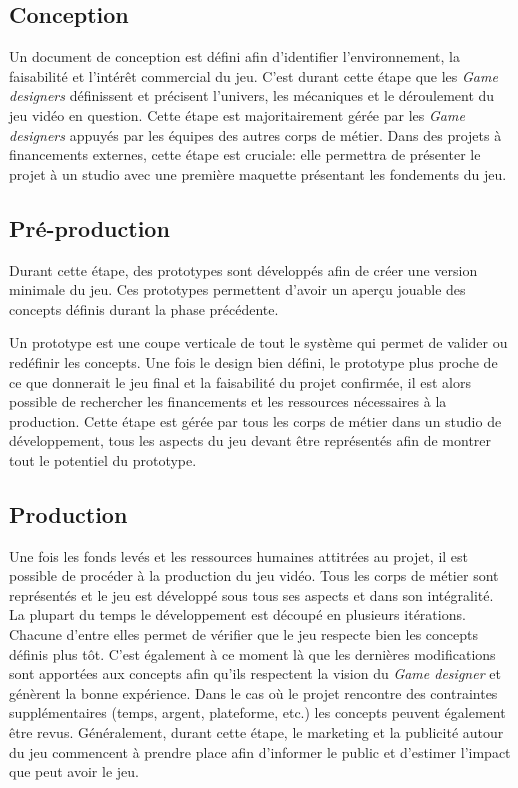 \subsection{Conception}

Un document de conception est défini afin d'identifier l'environnement, la faisabilité et l'intérêt commercial du jeu. C'est durant cette étape que les \emph{Game designers} définissent et précisent l'univers, les mécaniques et le déroulement du jeu vidéo en question. Cette étape est majoritairement gérée par les \emph{Game designers} appuyés par les équipes des autres corps de métier. Dans des projets à financements externes, cette étape est cruciale: elle permettra de présenter le projet à un studio avec une première maquette présentant les fondements du jeu.

\subsection{Pré-production}
Durant cette étape, des prototypes sont développés afin de créer une version minimale du jeu. Ces prototypes permettent d'avoir un aperçu jouable des concepts définis durant la phase précédente. 

Un prototype est une coupe verticale de tout le système qui permet de valider ou redéfinir les concepts. Une fois le design bien défini, le prototype plus proche de ce que donnerait le jeu final et la faisabilité du projet confirmée, il est alors possible de rechercher les financements et les ressources nécessaires à la production. Cette étape est gérée par tous les corps de métier dans un studio de développement, tous les aspects du jeu devant être représentés afin de montrer tout le potentiel du prototype.

\subsection{Production}
Une fois les fonds levés et les ressources humaines attitrées au projet, il est possible de procéder à la production du jeu vidéo. Tous les corps de métier sont représentés et le jeu est développé sous tous ses aspects et dans son intégralité. La plupart du temps le développement est découpé en plusieurs itérations. Chacune d'entre elles permet de vérifier que le jeu respecte bien les concepts définis plus tôt. C'est également à ce moment là que les dernières modifications sont apportées aux concepts afin qu'ils respectent la vision du \emph{Game designer} et génèrent la bonne expérience. Dans le cas o\`u le projet rencontre des contraintes supplémentaires (temps, argent, plateforme, etc.) les concepts peuvent également être revus. Généralement, durant cette étape, le marketing et la publicité autour du jeu commencent à prendre place afin d'informer le public et d'estimer l'impact que peut avoir le jeu.



